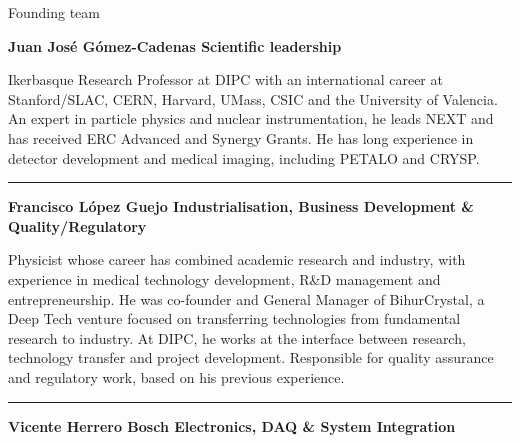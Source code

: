 \documentclass[aspectratio=169,11pt]{beamer}
\begin{document}
\begin{frame}{Founding team}
\linespread{0.70}\selectfont  

\vspace{-0.05cm}



\vspace{0.10cm}


{\scriptsize\bfseries\color{PTblue}
Juan José Gómez-Cadenas
\hfill
{\tiny\bfseries\color{black}
Scientific leadership}
}

\vspace{0.03cm}

{\tiny 
Ikerbasque Research Professor at DIPC with an international career at
Stanford/SLAC, CERN, Harvard, UMass, CSIC and the University of Valencia.
An expert in particle physics and nuclear instrumentation, he leads NEXT
and has received ERC Advanced and Synergy Grants. He has long experience
in detector development and medical imaging, including PETALO and CRYSP.
}

{\color{gray!35}\rule{\textwidth}{0.35pt}}


{\scriptsize\bfseries\color{PTblue}
Francisco López Guejo
\hfill
{\tiny\bfseries\color{black}
Industrialisation, Business Development \& Quality/Regulatory}
}

\vspace{0.03cm}

{\tiny
Physicist whose career has combined academic research and industry,
with experience in medical technology development, R\&D management and
entrepreneurship. He was co-founder and General Manager of BihurCrystal,
a Deep Tech venture focused on transferring technologies from fundamental
research to industry. At DIPC, he works at the interface between research,
technology transfer and project development.
Responsible for quality assurance and regulatory work, based on his previous experience.
}

{\color{gray!35}\rule{\textwidth}{0.35pt}}


{\scriptsize\bfseries\color{PTblue}
Vicente Herrero Bosch
\hfill
{\tiny\bfseries\color{black}
Electronics, DAQ \& System Integration}
}




\end{frame}
\end{document}

